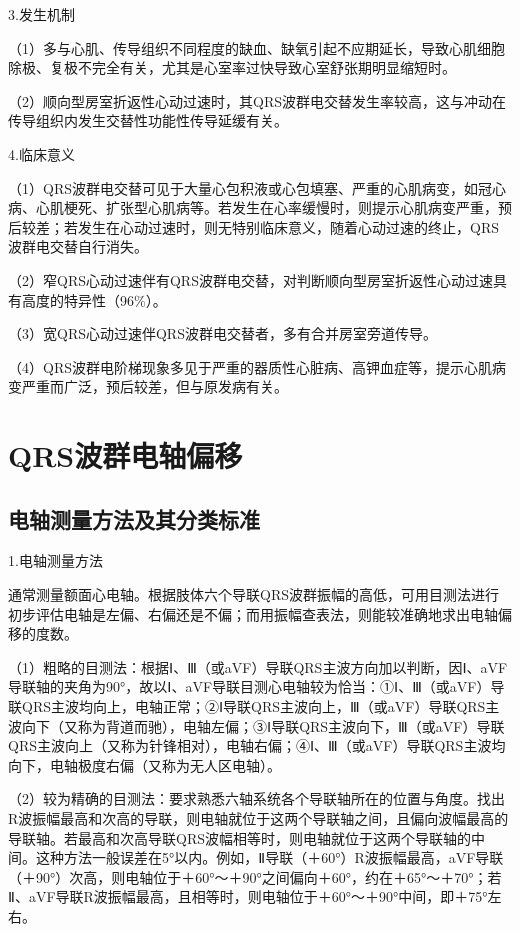 3.发生机制

（1）多与心肌、传导组织不同程度的缺血、缺氧引起不应期延长，导致心肌细胞除极、复极不完全有关，尤其是心室率过快导致心室舒张期明显缩短时。

（2）顺向型房室折返性心动过速时，其QRS波群电交替发生率较高，这与冲动在传导组织内发生交替性功能性传导延缓有关。

4.临床意义

（1）QRS波群电交替可见于大量心包积液或心包填塞、严重的心肌病变，如冠心病、心肌梗死、扩张型心肌病等。若发生在心率缓慢时，则提示心肌病变严重，预后较差；若发生在心动过速时，则无特别临床意义，随着心动过速的终止，QRS波群电交替自行消失。

（2）窄QRS心动过速伴有QRS波群电交替，对判断顺向型房室折返性心动过速具有高度的特异性（96\%）。

（3）宽QRS心动过速伴QRS波群电交替者，多有合并房室旁道传导。

（4）QRS波群电阶梯现象多见于严重的器质性心脏病、高钾血症等，提示心肌病变严重而广泛，预后较差，但与原发病有关。

\protect\hypertarget{text00009.htmlux5cux23subid47}{}{}

\section{QRS波群电轴偏移}

\protect\hypertarget{text00009.htmlux5cux23subid48}{}{}

\subsection{电轴测量方法及其分类标准}

1.电轴测量方法

通常测量额面心电轴。根据肢体六个导联QRS波群振幅的高低，可用目测法进行初步评估电轴是左偏、右偏还是不偏；而用振幅查表法，则能较准确地求出电轴偏移的度数。

（1）粗略的目测法：根据Ⅰ、Ⅲ（或aVF）导联QRS主波方向加以判断，因Ⅰ、aVF导联轴的夹角为90°，故以Ⅰ、aVF导联目测心电轴较为恰当：①Ⅰ、Ⅲ（或aVF）导联QRS主波均向上，电轴正常；②Ⅰ导联QRS主波向上，Ⅲ（或aVF）导联QRS主波向下（又称为背道而驰），电轴左偏；③Ⅰ导联QRS主波向下，Ⅲ（或aVF）导联QRS主波向上（又称为针锋相对），电轴右偏；④Ⅰ、Ⅲ（或aVF）导联QRS主波均向下，电轴极度右偏（又称为无人区电轴）。

（2）较为精确的目测法：要求熟悉六轴系统各个导联轴所在的位置与角度。找出R波振幅最高和次高的导联，则电轴就位于这两个导联轴之间，且偏向波幅最高的导联轴。若最高和次高导联QRS波幅相等时，则电轴就位于这两个导联轴的中间。这种方法一般误差在5°以内。例如，Ⅱ导联（＋60°）R波振幅最高，aVF导联（＋90°）次高，则电轴位于＋60°～＋90°之间偏向＋60°，约在＋65°～＋70°；若Ⅱ、aVF导联R波振幅最高，且相等时，则电轴位于＋60°～＋90°中间，即＋75°左右。

